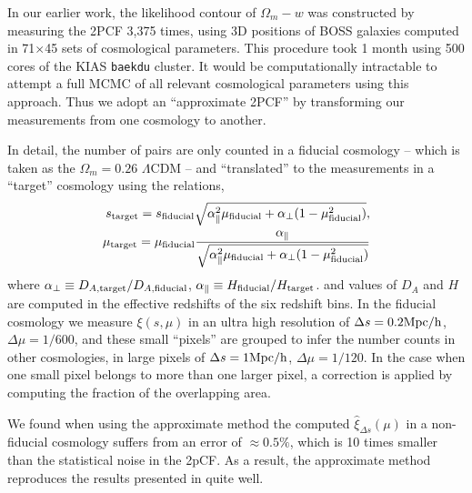 \documentclass{natureprintstyle}
\begin{document}
In our earlier work\cite{Li2016}, the likelihood contour of $\Omega_m-w$ was constructed by
measuring the 2PCF 3,375 times,
using 3D positions of BOSS galaxies computed in 71$\times$45 sets of cosmological parameters.
This procedure took 1 month using 500 cores of the KIAS {\texttt {baekdu}} cluster.
It would be computationally intractable to attempt a full MCMC of all relevant cosmological parameters using this approach. 
Thus we adopt an ``approximate 2PCF'' by transforming our measurements from one cosmology to another.

In detail, the number of pairs are only counted in a fiducial cosmology
-- which is taken as the $\Omega_m=0.26$ $\Lambda$CDM --
and ``translated'' to the measurements in a ``target'' cosmology using the relations, 
\begin{eqnarray}
 s_{\rm target} = s_{\rm fiducial} \sqrt{\alpha_{\parallel}^2 \mu_{\rm fiducial}+\alpha_{\bot}(1-\mu_{\rm fiducial}^2)}, \\
 \mu_{\rm target} = \mu_{\rm fiducial} \frac{\alpha_\parallel}
 {\sqrt{\alpha_{\parallel}^2 \mu_{\rm fiducial} +\alpha_{\bot}(1-\mu_{\rm fiducial}^2)}}
\end{eqnarray}
where $\alpha_{\bot}\equiv D_{A,\rm target}/D_{A,\rm fiducial}$,
$\alpha_{\parallel}\equiv H_{\rm fiducial}/H_{\rm target}$.
and values of $D_A$ and $H$ are computed in the effective redshifts of the six redshift bins.
In the fiducial cosmology
we measure $\xi(s,\mu)$ in an ultra high resolution of
$\Delta s = 0.2 {\rm Mpc/h}$, $\Delta \mu = 1/600$,
and these small ``pixels'' are grouped to infer 
the number counts in other cosmologies, 
in large pixels of $\Delta s = 1 {\rm Mpc/h}$, $\Delta \mu = 1/120$.
In the case when one small pixel belongs to more than one larger pixel,
a correction is applied by computing the fraction of the overlapping area.

We found when using the approximate method the computed 
$\hat\xi_{\Delta s}(\mu)$ in a non-fiducial cosmology suffers from
an error of $\approx0.5\%$, which is 10 times smaller than 
the statistical noise in the 2pCF.
As a result, the approximate method reproduces the results presented in \cite{Li2016} quite well.
\end{document}
